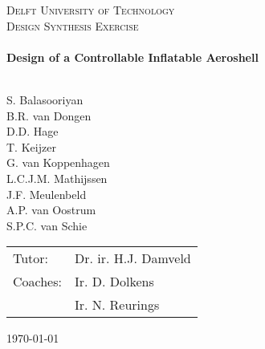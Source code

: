 \begin{titlepage}
\begin{center}
\AddToShipoutPicture*{\BackgroundPic}
\color{white}
\textsc{\LARGE Delft University of Technology}\\[0.3cm]
\textsc{\Large Design Synthesis Exercise}\\[0.5cm]

\vspace{5cm}
\HRule \\[0.4cm]
{\Large \bfseries Design of a Controllable Inflatable Aeroshell}\\[0.2cm]
\HRule \\[0.5cm]


\begin{flushleft}
\vspace{7cm}

S. Balasooriyan \\ B.R. van Dongen \\ D.D. Hage \\ T. Keijzer \\  G. van Koppenhagen \\ L.C.J.M. Mathijssen \\ J.F. Meulenbeld   \\ A.P. van Oostrum \\ S.P.C. van Schie\\
	\enlargethispage{15mm} \vspace{15mm}
	\hspace{-3.5mm}
	\begin{tabular}{l l}
		Tutor: & Dr. ir. H.J. Damveld \\
		Coaches: & Ir. D. Dolkens \\ 
		& Ir. N. Reurings \\
	\end{tabular}
\vfill
\begin{large}\today \end{large}
\end{flushleft}
\end{center}
\end{titlepage}